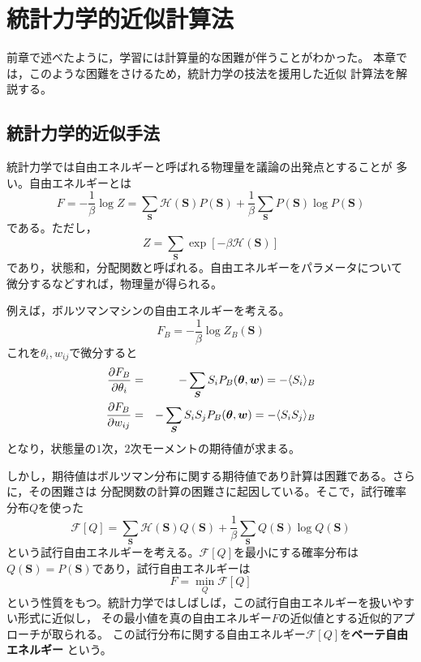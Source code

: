 \chapter{統計力学的近似計算法}
前章で述べたように，学習には計算量的な困難が伴うことがわかった。
本章では，このような困難をさけるため，統計力学の技法を援用した近似
計算法を解説する。
\section{統計力学的近似手法}
統計力学では自由エネルギーと呼ばれる物理量を議論の出発点とすることが
多い。自由エネルギーとは
\begin{equation}
F=-\frac{1}{\beta}\log Z=\sum_{\bm{S}}\mathcal{H}(\bm{S})
P(\bm{S})+\frac{1}{\beta}\sum_{\bm{S}}P(\bm{S})\log P(\bm{S})
\label{eq:4.1}
\end{equation}
である。ただし，
\begin{equation}
Z=\sum_{\bm{S}}\exp[-\beta\mathcal{H}(\bm{S})]\nonumber
\end{equation}
であり，状態和，分配関数と呼ばれる。自由エネルギーをパラメータについて
微分するなどすれば，物理量が得られる。

例えば，ボルツマンマシンの自由エネルギーを考える。
\begin{equation}
F_{B}=-\frac{1}{\beta}\log Z_{B}(\bm{S})\label{eq:4.2}
\end{equation}
これを$\theta_{i},w_{ij}$で微分すると
\begin{eqnarray}
\frac{\partial F_{B}}{\partial\theta_{i}}&=&-\sum_{\bm{S}}
S_{i}P_{B}(\boldsymbol{\theta},\bm{w})=-\langle S_{i}\rangle_{B}\label{eq:4.3}\\
\frac{\partial F_{B}}{\partial w_{ij}}&=&-\sum_{\bm{S}}
S_{i}S_{j}P_{B}(\boldsymbol{\theta},\bm{w})=-\langle S_{i}S_{j}\rangle_{B}
\label{eq:4.4}
\end{eqnarray}
となり，状態量の$1$次，$2$次モーメントの期待値が求まる。

しかし，期待値はボルツマン分布に関する期待値であり計算は困難である。さらに，その困難さは
分配関数の計算の困難さに起因している。そこで，試行確率分布$Q$を使った
\begin{equation}
\mathcal{F}[Q]=\sum_{\bm{S}}\mathcal{H}(\bm{S})Q(\bm{S})
+\frac{1}{\beta}\sum_{\bm{S}}Q(\bm{S})\log Q(\bm{S})\label{eq:4.5}
\end{equation}
という試行自由エネルギーを考える。$\mathcal{F}[Q]$を最小にする確率分布は
$Q(\bm{S})=P(\bm{S})$であり，試行自由エネルギーは
\begin{equation}
F=\min_{Q}\mathcal{F}[Q]\label{eq:4.6}
\end{equation}
という性質をもつ。統計力学ではしばしば，この試行自由エネルギーを扱いやすい形式に近似し，
その最小値を真の自由エネルギー$F$の近似値とする近似的アプローチが取られる。
この試行分布に関する自由エネルギー$\mathcal{F}[Q]$を\textbf{ベーテ自由エネルギー}
という。

